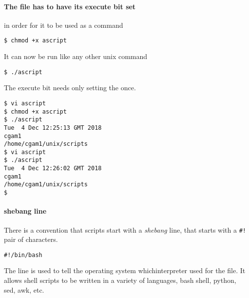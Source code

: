 \documentclass[12pt,a4paper]{article}
\begin{document}
\paragraph{The file has to have its execute bit set } in order for it
to be used as a command
\begin{terminal}
\begin{verbatim}
$ chmod +x ascript
\end{verbatim}
\end{terminal}
It can now be run like any other unix command
\begin{terminal}
\begin{verbatim}
$ ./ascript
\end{verbatim}
\end{terminal}
The execute bit needs only setting the once.

\begin{terminal}
\begin{verbatim}
$ vi ascript
$ chmod +x ascript
$ ./ascript
Tue  4 Dec 12:25:13 GMT 2018
cgam1
/home/cgam1/unix/scripts
$ vi ascript
$ ./ascript
Tue  4 Dec 12:26:02 GMT 2018
cgam1
/home/cgam1/unix/scripts
$
\end{verbatim}
\end{terminal}

\paragraph{shebang line}
There is a convention that scripts start with a \emph{shebang} line, that
starts with a \verb'#!' pair of characters.
\begin{code}
\begin{verbatim}
#!/bin/bash
\end{verbatim}
\end{code}
The line is used to tell the operating system whichinterpreter used for the
file.  It allows shell scripts to be written in a variety of languages, bash
shell, python, sed, awk, etc.
\end{document}

